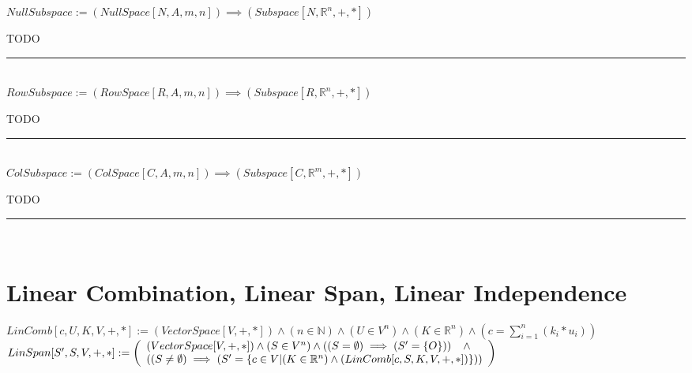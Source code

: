\documentclass{book}
\newcommand{\abr}{:=}
\begin{document}
$NullSubspace \abr (NullSpace[N, A, m, n]) \implies (Subspace[N, \mathbb{R}^n, +, *])$
\begin{enumerate}
  \lit TODO
\end{enumerate} \vspace{.75mm} \hrule \vspace{.75mm} \ \\ 

$RowSubspace \abr (RowSpace[R, A, m, n]) \implies (Subspace[R, \mathbb{R}^n, +, *])$
\begin{enumerate}
  \lit TODO
\end{enumerate} \vspace{.75mm} \hrule \vspace{.75mm} \ \\ 

$ColSubspace \abr (ColSpace[C, A, m, n]) \implies (Subspace[C, \mathbb{R}^m, +, *])$
\begin{enumerate}
  \lit TODO
\end{enumerate} \vspace{.75mm} \hrule \vspace{.75mm} \ \\

\section{Linear Combination, Linear Span, Linear Independence}
$LinComb[c, U, K, V, +, *] \abr (VectorSpace[V, +, *]) \land (n \in \mathbb{N}) \land (U \in V^n) \land (K \in \mathbb{R}^n) \land (c = \sum_{i = 1}^{n}(k_i * u_i))$ \\
$LinSpan[S', S, V, +, *] \abr \left(\begin{array}{ll}
  (VectorSpace[V, +, *]) \land (S \in V^n) \land ((S = \emptyset) \implies (S' = \{O\})) \hfill \land \hfill \\
  ((S \neq \emptyset) \implies (S' = \{c \in V | (K \in \mathbb{R}^n) \land (LinComb[c, S, K, V, +, *])\}))
\end{array}\right)$ \\
\end{document}

